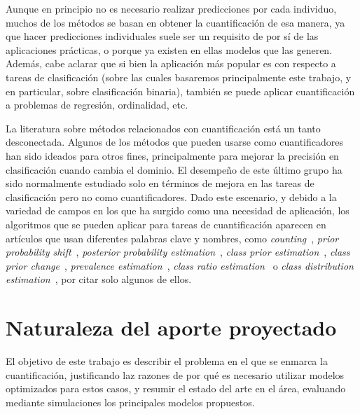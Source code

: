 \documentclass[a4paper, twoside, 11pt, spanish]{article}
\begin{document}
Aunque en principio no es necesario realizar predicciones por cada individuo,
muchos de los métodos se basan en obtener la cuantificación de esa manera, ya
que hacer predicciones individuales suele ser un requisito de por sí de las
aplicaciones prácticas, o porque ya existen en ellas modelos que las generen.
Además, cabe aclarar que si bien la aplicación más popular es con respecto a
tareas de clasificación (sobre las cuales basaremos principalmente este trabajo,
y en particular, sobre clasificación binaria), también se puede aplicar
cuantificación a problemas de regresión, ordinalidad, etc.

La literatura sobre métodos relacionados con cuantificación está un tanto
desconectada. Algunos de los métodos que pueden usarse como cuantificadores han
sido ideados para otros fines, principalmente para mejorar la precisión en
clasificación cuando cambia el dominio. El desempeño de este último grupo ha
sido normalmente estudiado solo en términos de mejora en las tareas de
clasificación pero no como cuantificadores. Dado este escenario, y debido a la
variedad de campos en los que ha surgido como una necesidad de aplicación, los
algoritmos que se pueden aplicar para tareas de cuantificación aparecen en
artículos que usan diferentes palabras clave y nombres, como {\it
counting\/}~\cite{lewis1995evaluating}, {\it prior probability
shift\/}~\cite{moreno2012unifying, storkey2009training}, {\it posterior
probability estimation\/}~\cite{alaiz2011class}, {\it class prior
estimation\/}~\cite{du2014class, chan2006estimating, zhang2010transfer}, {\it
class prior change\/}~\cite{du2014semi}, {\it prevalence
estimation\/}~\cite{barranquero2013study}, {\it class ratio
estimation\/}~\cite{asoh2012fast} o {\it class distribution
estimation\/}~\cite{gonzalez2013class, limsetto2011handling,
xue2009quantification}, por citar solo algunos de ellos.

\section*{Naturaleza del aporte proyectado}

El objetivo de este trabajo es describir el problema en el que se enmarca la
cuantificación, justificando laz razones de por qué es necesario utilizar
modelos optimizados para estos casos, y resumir el estado del arte en el área,
evaluando mediante simulaciones los principales modelos propuestos.

\bigskip


\end{document}
